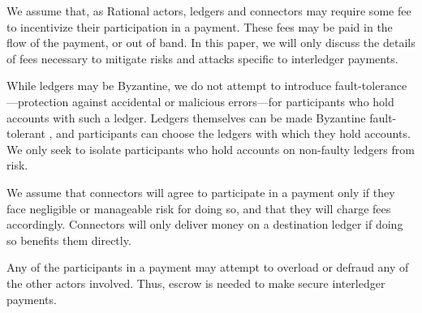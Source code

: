 \documentclass[letterpaper,twocolumn,10pt]{article}
\begin{document}

We assume that, as Rational actors, ledgers and connectors may require some fee to incentivize their participation in a payment. These fees may be paid in the flow of the payment, or out of band. In this paper, we will only discuss the details of fees necessary to mitigate risks and attacks specific to interledger payments.

While ledgers may be Byzantine, we do not attempt to introduce fault-tolerance---protection against accidental or malicious errors---for participants who hold accounts with such a ledger. Ledgers themselves can be made Byzantine fault-tolerant \cite{mazieresstellar,Bitcoin,schwartz2014ripple}, and participants can choose the ledgers with which they hold accounts. We only seek to isolate participants who hold accounts on non-faulty ledgers from risk.




We assume that connectors will agree to participate in a payment only if they face negligible or manageable risk for doing so, and that they will charge fees accordingly. Connectors will only deliver money on a destination ledger if doing so benefits them directly.

Any of the participants in a payment may attempt to overload or defraud any of the other actors involved. Thus, escrow is needed to make secure interledger payments.

\end{document}
